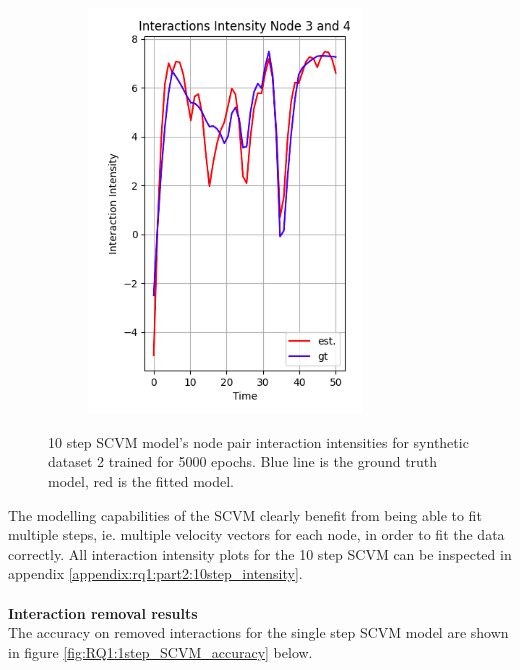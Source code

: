 \begin{figure}[H]
\begin{subfigure}[b]{0.45\textwidth}
    \end{subfigure}
    \hfill
    \begin{subfigure}[b]{0.45\textwidth}
        \includegraphics[width=0.8\textwidth]{0_images/rq1_10step_SCVM_intensity2.png}
    \end{subfigure}
    \caption{10 step SCVM model's node pair interaction intensities for synthetic dataset 2 trained for 5000 epochs. Blue line is the ground truth model, red is the fitted model.}
    \label{fig:RQ1:part2:10step_intensity}
\end{figure}
\noindent
The modelling capabilities of the SCVM clearly benefit from being able to fit multiple steps, ie. multiple velocity vectors for each node, in order to fit the data correctly.
All interaction intensity plots for the 10 step SCVM can be inspected in appendix \ref{appendix:rq1:part2:10step_intensity}.
\\\\
\textbf{Interaction removal results}
\\
The accuracy on removed interactions for the single step SCVM model are shown in figure \ref{fig:RQ1:1step_SCVM_accuracy} below.
